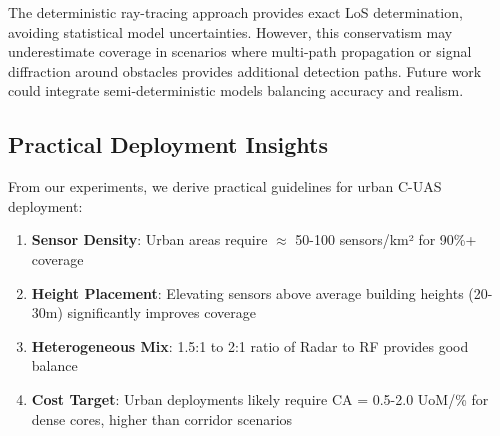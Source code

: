 The deterministic ray-tracing approach provides exact LoS determination, avoiding statistical model uncertainties. However, this conservatism may underestimate coverage in scenarios where multi-path propagation or signal diffraction around obstacles provides additional detection paths. Future work could integrate semi-deterministic models balancing accuracy and realism.

\subsection{Practical Deployment Insights}

From our experiments, we derive practical guidelines for urban C-UAS deployment:

\begin{enumerate}
\item \textbf{Sensor Density}: Urban areas require $\approx$ 50-100 sensors/km² for 90\%+ coverage
\item \textbf{Height Placement}: Elevating sensors above average building heights (20-30m) significantly improves coverage
\item \textbf{Heterogeneous Mix}: 1.5:1 to 2:1 ratio of Radar to RF provides good balance
\item \textbf{Cost Target}: Urban deployments likely require CA = 0.5-2.0 UoM/\% for dense cores, higher than corridor scenarios
\end{enumerate}

